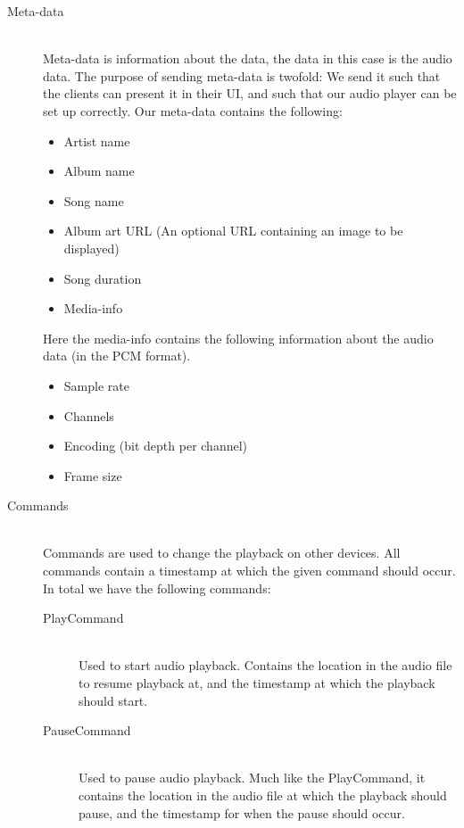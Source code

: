 \begin{description}
    \item[Meta-data] \hfill \\
        Meta-data is information about the data, the data in this case is the audio data.
        The purpose of sending meta-data is twofold: We send it such that the clients can present it in their UI, and such that our audio player can be set up correctly.
        Our meta-data contains the following:
        \begin{itemize}
            \item Artist name
            \item Album name
            \item Song name
            \item Album art URL (An optional URL containing an image to be displayed)
            \item Song duration
            \item Media-info
        \end{itemize}
        Here the media-info contains the following information about the audio data (in the \ac{PCM} format).
        \begin{itemize}
            \item Sample rate
            \item Channels
            \item Encoding (bit depth per channel)
            \item Frame size
        \end{itemize}
    \item[Commands] \hfill \\
        Commands are used to change the playback on other devices.
        All commands contain a timestamp at which the given command should occur.
        In total we have the following commands:
        \begin{description}
            \item[PlayCommand] \hfill\\
                Used to start audio playback.
                Contains the location in the audio file to resume playback at, and the timestamp at which the playback should start.
            \item[PauseCommand] \hfill\\
                Used to pause audio playback.
                Much like the PlayCommand, it contains the location in the audio file at which the playback should pause, and the timestamp for when the pause should occur.

\end{description}
\end{description}
